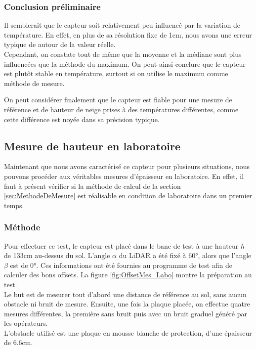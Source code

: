 \subsubsection{Conclusion préliminaire} 

Il semblerait que le capteur soit relativement peu influencé par la variation de température. En
effet, en plus de sa résolution fixe de 1cm, nous avons une erreur typique de \textpm 2cm autour
de la valeur réelle.\\
Cependant, on constate tout de même que la moyenne et la médiane sont plus influencées que la méthode
du maximum. On peut ainsi conclure que le capteur est plutôt stable en température, surtout si on
utilise le maximum comme méthode de mesure.\par 
On peut considérer finalement que le capteur est fiable pour une mesure de référence et de hauteur
de neige prises à des températures différentes, comme cette différence est noyée dans sa précision
typique.

\subsection{Mesure de hauteur en laboratoire}

Maintenant que nous avons caractérisé ce capteur pour plusieurs situations, nous pouvons procéder aux
véritables mesures d'épaisseur en laboratoire. En effet, il faut à présent vérifier si la méthode de
calcul de la section \ref{sec:MethodeDeMesure} est réalisable en condition de laboratoire dans un premier
temps.

\subsubsection{Méthode}

Pour effectuer ce test, le capteur est placé dans le banc de test à une hauteur $h$ de 133cm au-dessus
du sol. L'angle $\alpha$ du LiDAR a été fixé à 60°, alors que l'angle $\beta$ est de 0°. Ces informations 
ont été fournies au programme de test afin de calculer des bons offsets. La figure \ref{fig:OffsetMes_Labo}
montre la préparation au test.\\
Le but est de mesurer tout d'abord une distance de référence au sol, sans aucun obstacle ni bruit de
mesure. Ensuite, une fois la plaque placée, on effectue quatre mesures différentes, la première sans
bruit puis avec un bruit graduel généré par les opérateurs.\\
L'obstacle utilisé est une plaque en mousse blanche de protection, d'une épaisseur de 6.6cm.

